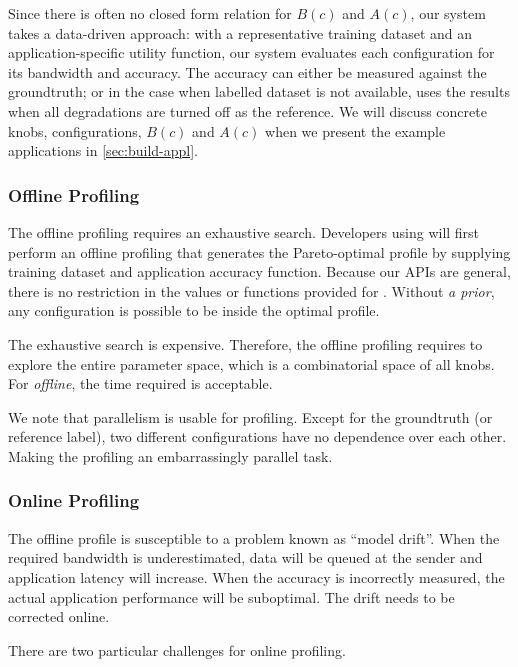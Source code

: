 Since there is often no closed form relation for $B(c)$ and $A(c)$, our system
takes a data-driven approach: with a representative training dataset and an
application-specific utility function, our system evaluates each configuration
for its bandwidth and accuracy. The accuracy can either be measured against the
groundtruth; or in the case when labelled dataset is not available, \sysname{}
uses the results when all degradations are turned off as the reference. We will
discuss concrete knobs, configurations, $B(c)$ and $A(c)$ when we present the
example applications in \autoref{sec:build-appl}.

\subsubsection{Offline Profiling}
\label{sec:offline-profiling}

The offline profiling requires an exhaustive search. Developers using \sysname{}
will first perform an offline profiling that generates the Pareto-optimal
profile by supplying training dataset and application accuracy function. Because
our APIs are general, there is no restriction in the values or functions
provided for \maybe{}. Without \textit{a prior}, any configuration is possible
to be inside the optimal profile.

The exhaustive search is expensive. Therefore, the offline profiling requires to
explore the entire parameter space, which is a combinatorial space of all
knobs. For \textit{offline}, the time required is acceptable.

We note that parallelism is usable for profiling. Except for the groundtruth (or
reference label), two different configurations have no dependence over each
other. Making the profiling an embarrassingly parallel task.

\subsubsection{Online Profiling}
\label{sec:online-profiling}

The offline profile is susceptible to a problem known as ``model drift''. When
the required bandwidth is underestimated, data will be queued at the sender and
application latency will increase. When the accuracy is incorrectly measured,
the actual application performance will be suboptimal. The drift needs to be
corrected online.

There are two particular challenges for online profiling.

